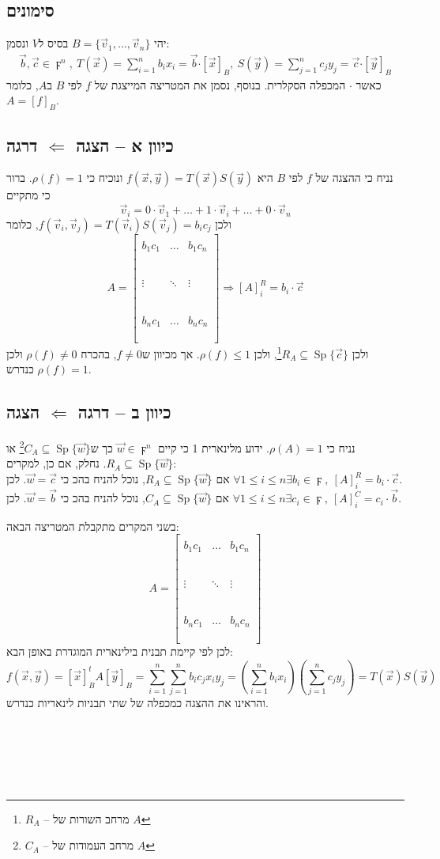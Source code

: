 \documentclass[11pt, oneside]{article}
\newcommand{\qed}{\R{$\blacksquare$}}
\newcommand{\br}{\\\\\\\\\\\\}
\newcommand{\logr}{\Rightarrow}
\newcommand{\ms}[3]{\R{מסקנה #3#2.#1}}
\DeclareMathOperator{\Sp}{Sp}
\def\dotp{\boldsymbol{\cdot}}
\def\v{\vec{v}}
\def\w{\vec{w}}
\begin{document}
\subsection*{סימונים}
יהי $B = \{\v_{1}, \ldots, \v_{n}\}$ בסיס ל$V$ ונסמן:
\begin{align*}
\vec{b}, \vec{c}\in \digamma^{n},\ T(\vec{x}) = \sum^{n}_{i=1}b_{i}x_{i} = \vec{b} \dotp [\vec{x}]_{B},\ S(\vec{y}) = \sum^{n}_{j=1}c_{j}y_{j} = \vec{c} \dotp [\vec{y}]_{B}
\end{align*}
כאשר $\dotp$ המכפלה הסקלרית. בנוסף, נסמן את המטריצה המייצגת של $f$ לפי $B$ ב$A$, כלומר $A = [f]_{B}$.
\subsection*{כיוון א -- הצגה $\Leftarrow$ דרגה}
נניח כי ההצגה של $f$ לפי $B$ היא $f(\vec{x}, \vec{y}) = T(\vec{x})S(\vec{y})$ ונוכיח כי $\rho(f) = 1$. ברור כי מתקיים
\[
\v_{i} = 0 \cdot \v_{1} + \ldots + 1 \cdot \v_{i} + \ldots + 0 \cdot \v_{n}
\]
ולכן $f(\v_{i}, \v_{j}) = T(\v_{i})S(\v_{j}) = b_{i}c_{j}$, כלומר
\[
A = \begin{bmatrix}\\
b_{1}c_{1} & \dots & b_{1}c_{n}\br
\vdots & \ddots & \vdots\br
b_{n}c_{1} & \dots & b_{n}c_{n}\\\\\\
\end{bmatrix} \logr
[A]^{R}_{i} = b_{i} \cdot \vec{c}
\]
ולכן $R_{A} \subseteq \Sp{\{\vec{c}\}}$\footnote{$R_{A}$ -- מרחב השורות של $A$}, ולכן $\rho(f) \le 1$. אך מכיוון ש$f \neq 0$, בהכרח $\rho(f) \neq 0$ ולכן $\rho(f) = 1$ כנדרש.

\subsection*{כיוון ב -- דרגה $\Leftarrow$ הצגה}
נניח כי $\rho(A) = 1$. ידוע מלינארית 1 כי קיים $\w \in \digamma^{n}$ כך ש$C_{A} \subseteq \Sp\{\w\}$\footnote{$C_{A}$ -- מרחב העמודות של $A$} או $R_{A} \subseteq \Sp\{\w\}$. נחלק, אם כן, למקרים:\\
אם $R_{A} \subseteq \Sp\{\w\}$, נוכל להניח בהכ כי $\w = \vec{c}$. לכן $\forall 1 \le i \le n \exists b_{i} \in \digamma,\ [A]^{R}_{i} = b_{i} \cdot \vec{c}$.\\
אם $C_{A} \subseteq \Sp\{\w\}$, נוכל להניח בהכ כי $\w = \vec{b}$. לכן $\forall 1 \le i \le n \exists c_{i} \in \digamma,\ [A]^{C}_{i} = c_{i} \cdot \vec{b}$.

בשני המקרים מתקבלת המטריצה הבאה:
\[
A = \begin{bmatrix}\\
b_{1}c_{1} & \dots & b_{1}c_{n}\br
\vdots & \ddots & \vdots\br
b_{n}c_{1} & \dots & b_{n}c_{n}\\\\\\
\end{bmatrix}
\]
לכן לפי \ms{01}{8}{} קיימת תבנית בילינארית המוגדרת באופן הבא:
\[
f(\vec{x}, \vec{y}) = [\vec{x}]^{t}_{B}A[\vec{y}]_{B} = \sum^{n}_{i=1}\sum^{n}_{j=1}b_{i}c_{j}x_{i}y_{j} = \left(\sum^{n}_{i=1}b_{i}x_{i}\right)\left(\sum^{n}_{j=1}c_{j}y_{j}\right) = T(\vec{x})S(\vec{y})
\]
והראינו את ההצגה כמכפלה של שתי תבניות לינאריות כנדרש.
\br\qed
\end{document}
